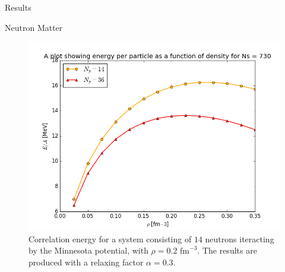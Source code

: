 \documentclass[twoside,english]{uiofysmaster}
\begin{document}
\begin{chapter}{Results}
\begin{section}{Neutron Matter}
\begin{figure}[]
      \label{figure:thermodynamic_limit}
    \end{figure}
    \begin{figure}[]
      \includegraphics[width=\textwidth]{../NuclearMatter/Results/Figures/Vary_rho_Nh14.png}
      \caption{Correlation energy for a system consisting of $14$ neutrons iteracting by the Minnesota potential, with $\rho=0.2\text{ fm}^{-3}$. The results are produced with a relaxing factor $\alpha=0.3$. }
      \label{figure:thermodynamic_limit}
    \end{figure}


  \end{section}

\end{chapter}
\end{document}
